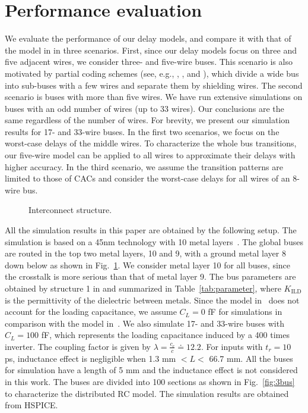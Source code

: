 \documentclass[10pt,journal]{IEEEtran}
\begin{document}
\section{Performance evaluation}\label{sec:simulation}
We evaluate the performance of our delay models, and compare it with that of the model in \cite{Sot01} in three scenarios. First, since our delay models focus on three and five adjacent wires, we consider three- and five-wire buses. This scenario is also motivated by partial coding schemes (see, e.g., \cite{Dua01}, \cite{Vic01}, and \cite{Sri07}), which divide a wide bus into sub-buses with a few wires and separate them by shielding wires.
The second scenario is buses with more than five wires. We have run extensive simulations on buses with an odd number of wires (up to 33 wires). Our conclusions are the same regardless of the number of wires. For brevity, we present our simulation results for 17- and 33-wire buses.
In the first two scenarios, we focus on the worst-case delays of the middle wires. To characterize the whole bus transitions, our five-wire model can be applied to all wires to approximate their delays with higher accuracy.
In the third scenario, we assume the transition patterns are limited to those of CACs and consider the worst-case delays for all wires of an 8-wire bus.


\begin{figure}[!tb]
\begin{minipage}[b]{1.0\linewidth}
  \centering
 \centerline{}
\end{minipage}
\caption{Interconnect structure.}
\label{fig:interconnect}
\end{figure}

All the simulation results in this paper are obtained by the following setup. The simulation is based on a 45nm technology with 10 metal layers~\cite{FreePDK45}. The global buses are routed in the top two metal layers, 10 and 9, with a ground metal layer 8 down below as shown in Fig.~\ref{fig:interconnect}.
We consider metal layer 10 for all buses, since the crosstalk is more serious than that of metal layer 9.
The bus parameters are obtained by structure 1 in \cite{PTM} and summarized in Table~\ref{tab:parameter}, where $K_{\textrm{ILD}}$ is the permittivity of the dielectric between metals.
Since the model in~\cite{Sot01} does not account for the loading capacitance, we assume $C_L = 0$ fF for simulations in comparison with the model in~\cite{Sot01}. We also simulate 17- and 33-wire buses with $C_L = 100$ fF, which represents the loading capacitance induced by a 400 times inverter.
The coupling factor is given by $\lambda = \frac{c_c}{c} \doteq 12.2$.
For inputs with $t_r = 10$ ps, inductance effect is negligible when 1.3 mm $< L <$ 66.7 mm. All the buses for simulation have a length of 5 mm and the inductance effect is not considered in this work. The buses are divided into 100 sections as shown in Fig.~\ref{fig:3bus} to characterize the distributed RC model. The simulation results are obtained from HSPICE.
\end{document}
